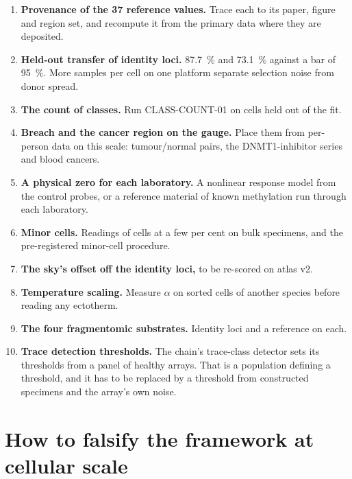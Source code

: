 \begin{enumerate}
\item \textbf{Provenance of the 37 reference values.} Trace each to its paper, figure and region set, and recompute it from the primary data where they are deposited.
\item \textbf{Held-out transfer of identity loci.} 87.7~\% and 73.1~\% against a bar of 95~\%. More samples per cell on one platform separate selection noise from donor spread.
\item \textbf{The count of classes.} Run CLASS-COUNT-01 on cells held out of the fit.
\item \textbf{Breach and the cancer region on the gauge.} Place them from per-person data on this scale: tumour/normal pairs, the DNMT1-inhibitor series and blood cancers.
\item \textbf{A physical zero for each laboratory.} A nonlinear response model from the control probes, or a reference material of known methylation run through each laboratory.
\item \textbf{Minor cells.} Readings of cells at a few per cent on bulk specimens, and the pre-registered minor-cell procedure.
\item \textbf{The sky's offset off the identity loci,} to be re-scored on atlas v2.
\item \textbf{Temperature scaling.} Measure $\alpha$ on sorted cells of another species before reading any ectotherm.
\item \textbf{The four fragmentomic substrates.} Identity loci and a reference on each.
\item \textbf{Trace detection thresholds.} The chain's trace-class detector sets its thresholds from a panel of healthy arrays. That is a population defining a threshold, and it has to be
      replaced by a threshold from constructed specimens and the array's own noise.
\end{enumerate}

\section{How to falsify the framework at cellular scale}


